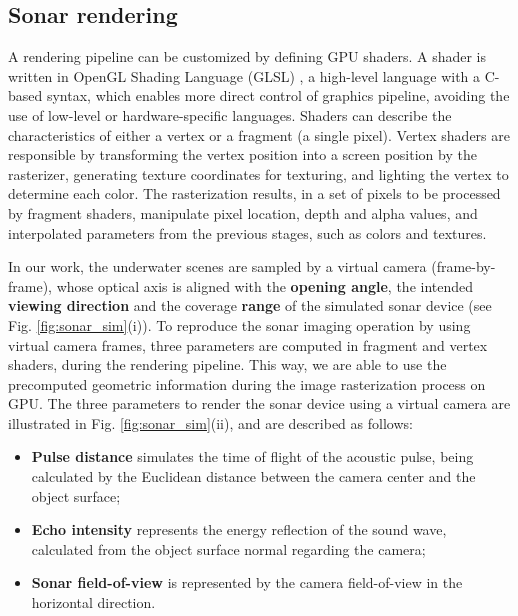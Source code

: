 \documentclass[final,5p,times]{elsarticle}
\begin{document}
\subsection{Sonar rendering}
\label{dev:shader}

A rendering pipeline can be customized by defining GPU shaders. A shader is written in OpenGL Shading Language (GLSL) \cite{rost2009}, a high-level language with a C-based syntax, which enables more direct control of graphics pipeline, avoiding the use of low-level or hardware-specific languages. Shaders can describe the characteristics of either a vertex or a fragment (a single pixel). Vertex shaders are responsible by transforming the vertex position into a screen position by the rasterizer, generating texture coordinates for texturing, and lighting the vertex to determine each color. The rasterization results, in a set of pixels to be processed by fragment shaders, manipulate pixel location, depth and alpha values, and interpolated parameters from the previous stages, such as colors and textures.

In our work, the underwater scenes are sampled by a virtual camera (frame-by-frame), whose optical axis is aligned with the \textbf{opening angle}, the intended \textbf{viewing direction} and the coverage \textbf{range} of the simulated sonar device (see Fig. \ref{fig:sonar_sim}(i)). To reproduce the sonar imaging operation by using virtual camera frames, three parameters are computed in fragment and vertex shaders, during the rendering pipeline. This way, we are able to use the precomputed geometric information during the image rasterization process on GPU. The three parameters to render the sonar device using a virtual camera are illustrated in Fig. \ref{fig:sonar_sim}(ii), and are described as follows:

\begin{itemize}[]
    \item \textbf{Pulse distance} simulates the time of flight of the acoustic pulse, being calculated by the Euclidean distance between the camera center and the object surface;
    \item \textbf{Echo intensity} represents the energy reflection of the sound wave, calculated from the object surface normal regarding the camera;
    \item \textbf{Sonar field-of-view} is represented by the camera field-of-view in the horizontal direction.
\end{itemize}
\end{document}
